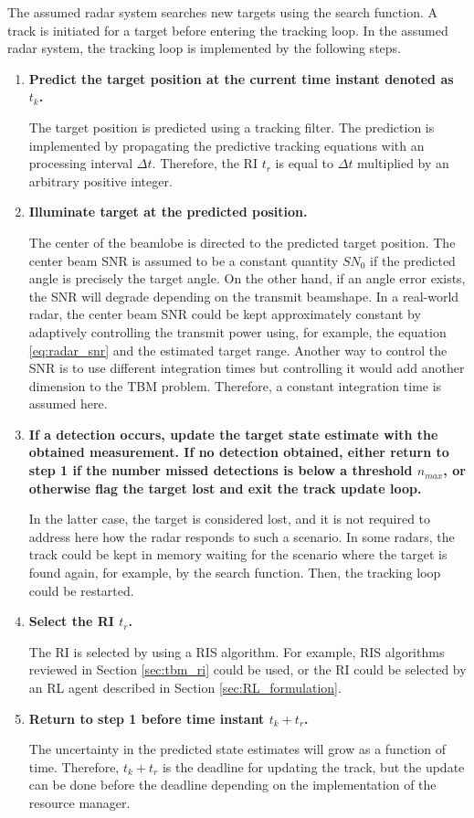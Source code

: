 \documentclass[english, 12pt, a4paper, elec, utf8, a-1b, online]{aaltothesis}
\newcommand{\dt}{\Delta t}
\newcommand{\ri}{t_r}
\begin{document}
The assumed radar system searches new targets using the search function. 
A track is initiated for a target before entering the tracking loop. 
In the assumed radar system, the tracking loop is implemented by the following steps.
\begin{enumerate}
\item\textbf{Predict the target position at the current time instant denoted as $t_k$.}

The target position is predicted using a tracking filter. The prediction is implemented by propagating the predictive tracking equations with an processing interval $\dt$. 
Therefore, the RI $t_r$ is equal to $\dt$ multiplied by an arbitrary positive integer.

\item\textbf{Illuminate target at the predicted position.}

The center of the beamlobe is directed to the predicted target position. 
The center beam SNR is assumed to be a constant quantity $SN_0$ if the predicted angle is precisely the target angle. 
On the other hand, if an angle error exists, the SNR will degrade depending on the transmit beamshape. 
In a real-world radar, the center beam SNR could be kept approximately constant by adaptively controlling the transmit power using, for example, the equation \eqref{eq:radar_snr} and the estimated target range. 
Another way to control the SNR is to use different integration times but controlling it would add another dimension to the TBM problem. 
Therefore, a constant integration time is assumed here.

\item\textbf{If a detection occurs, update the target state estimate with the obtained measurement. If no detection obtained, either return to step 1 if the number missed detections is below a threshold $n_{max}$, or otherwise flag the target lost and exit the track update loop.}

In the latter case, the target is considered lost, and it is not required to address here how the radar responds to such a scenario. 
In some radars, the track could be kept in memory waiting for the scenario where the target is found again, for example, by the search function. 
Then, the tracking loop could be restarted.


\item\textbf{Select the RI $\ri$.}

The RI is selected by using a RIS algorithm.
For example, RIS algorithms reviewed in Section \ref{sec:tbm_ri} could be used, or the RI could be selected by an RL agent described in Section \ref{sec:RL_formulation}.

\item\textbf{Return to step 1 before time instant $t_k + \ri$.}

The uncertainty in the predicted state estimates will grow as a function of time. Therefore, $t_k + \ri$ is the deadline for updating the track, but the update can be done before the deadline depending on the implementation of the resource manager.

\end{enumerate}
\end{document}
